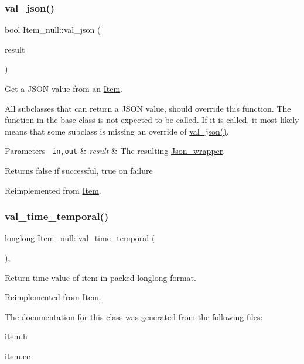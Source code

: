 \subsubsection{\texorpdfstring{val\+\_\+json()}{val\_json()}}
{\footnotesize\ttfamily bool Item\+\_\+null\+::val\+\_\+json (\begin{DoxyParamCaption}\item[{\mbox{\hyperlink{classJson__wrapper}{Json\+\_\+wrapper}} $\ast$}]{result }\end{DoxyParamCaption})\hspace{0.3cm}{\ttfamily [virtual]}}

Get a J\+S\+ON value from an \mbox{\hyperlink{classItem}{Item}}.

All subclasses that can return a J\+S\+ON value, should override this function. The function in the base class is not expected to be called. If it is called, it most likely means that some subclass is missing an override of \mbox{\hyperlink{classItem__null_a251248ba4bdd1ac6628c60db7c3aaa01}{val\+\_\+json()}}.


\begin{DoxyParams}[1]{Parameters}
\mbox{\texttt{ in,out}}  & {\em result} & The resulting \mbox{\hyperlink{classJson__wrapper}{Json\+\_\+wrapper}}.\\
\hline
\end{DoxyParams}
\begin{DoxyReturn}{Returns}
false if successful, true on failure 
\end{DoxyReturn}


Reimplemented from \mbox{\hyperlink{classItem_a57e763fcde2d0a819d21e31c59611290}{Item}}.

\mbox{\label{classItem__null_a9e65f0e26156a43bcb6c4d915389662d}} 
\subsubsection{\texorpdfstring{val\+\_\+time\+\_\+temporal()}{val\_time\_temporal()}}
{\footnotesize\ttfamily longlong Item\+\_\+null\+::val\+\_\+time\+\_\+temporal (\begin{DoxyParamCaption}{ }\end{DoxyParamCaption})\hspace{0.3cm}{\ttfamily [inline]}, {\ttfamily [virtual]}}

Return time value of item in packed longlong format. 

Reimplemented from \mbox{\hyperlink{classItem_a69ef60a3917a1bb4832498a695754c58}{Item}}.



The documentation for this class was generated from the following files\+:\begin{DoxyCompactItemize}
\item 
item.\+h\item 
item.\+cc\end{DoxyCompactItemize}
